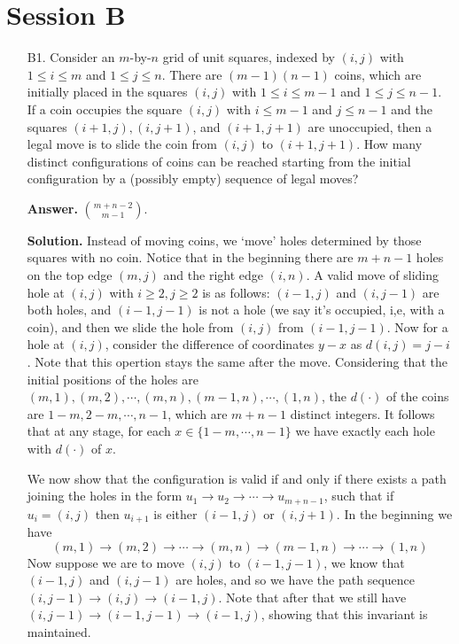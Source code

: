 \documentclass[11pt,a4paper]{article}
\begin{document}
	\section*{Session B}
	\begin{enumerate}
		\item [B1.]
		Consider an $m$-by-$n$ grid of unit squares, indexed by $(i, j)$ with $1 \leq i \leq m$ and $1 \leq j \leq n$. 
		There are $(m-1)(n-1)$ coins, which are initially placed in the squares $(i, j)$ with $1 \leq i \leq m-1$ and $1 \leq j \leq n-1$. 
		If a coin occupies the square $(i, j)$ with $i \leq m-1$ and $j \leq n-1$ and the squares $(i+1, j),(i, j+1)$, and $(i+1, j+1)$ are unoccupied, then a legal move is to slide the coin from $(i, j)$ to $(i+1, j+1)$.
	    How many distinct configurations of coins can be reached starting from the initial configuration by a (possibly empty) sequence of legal moves?
	    
	    \textbf{Answer.} 
	    $\binom{m + n - 2}{m - 1}$. 
	    
	    \textbf{Solution.} Instead of moving coins, we `move' holes determined by those squares with no coin. 
	    Notice that in the beginning there are $m + n - 1$ holes on the top edge $(m, j)$ and the right edge $(i, n)$. 
	    A valid move of sliding hole at $(i, j)$ with $i\ge 2, j\ge 2$ is as follows: $(i - 1, j)$ and $(i, j - 1)$ are both holes, 
	    and $(i - 1, j - 1)$ is not a hole (we say it's occupied, i,e, with a coin), 
	    and then we slide the hole from $(i, j)$ from $(i - 1, j - 1)$. 
	    Now for a hole at $(i, j)$, consider the difference of coordinates $y - x$ as $d(i, j) = j - i$. 
	    Note that this opertion stays the same after the move. 
	    Considering that the initial positions of the holes 
	    are $(m, 1), (m, 2), \cdots, (m, n), (m - 1, n), \cdots, (1, n)$, 
	    the $d(\cdot)$ of the coins are 
	    $1 -m, 2 - m, \cdots, n - 1$, which are $m + n - 1$ distinct integers. 
	    It follows that at any stage, for each $x\in \{1 - m, \cdots, n - 1\}$ we have exactly each hole with $d(\cdot)$ of $x$. 
	    
	    We now show that the configuration is valid if and only if there exists a path joining the holes 
	    in the form $u_1\to u_2\to\cdots \to u_{m + n - 1}$, 
	    such that if $u_i = (i, j)$ then $u_{i + 1}$ is either $(i - 1, j)$ or $(i, j + 1)$. 
	    In the beginning we have 
	    \[
	    (m, 1)\to (m, 2)\to \cdots \to (m, n)\to (m - 1, n)\to \cdots \to (1, n)
	    \]
	    Now suppose we are to move $(i, j)$ to $(i - 1, j - 1)$, we know that $(i - 1, j )$ and $(i, j - 1)$ are holes, 
	    and so we have the path sequence 
	    $(i, j - 1) \to (i, j)\to (i - 1, j)$. 
	    Note that after that we still have $(i, j - 1) \to (i - 1, j - 1)\to (i - 1, j)$, 
	    showing that this invariant is maintained. 
	    

\end{enumerate}
\end{document}
